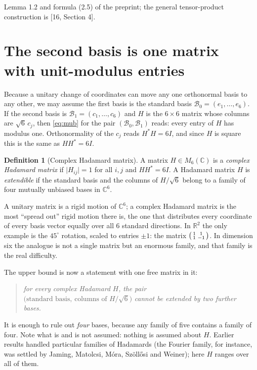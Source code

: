 \documentclass[11pt]{article}
\theoremstyle{definition}
\newtheorem{definition}{Definition}[section]
\theoremstyle{plain}
\theoremstyle{definition}
\newcommand{\C}{\mathbb{C}}
\newcommand{\R}{\mathbb{R}}
\newcommand{\abs}[1]{\lvert #1\rvert}
\newenvironment{claim}{\begin{quote}\itshape}{\end{quote}}
\begin{document}
\begin{paperbox}
Lemma 1.2 and formula (2.5) of the preprint; the general tensor-product construction is [16, Section 4].
\end{paperbox}

\section{The second basis is one matrix with unit-modulus entries}\label{sec:hadamard}

Because a unitary change of coordinates can move any one orthonormal basis to any other, we may
assume the first basis is the standard basis $\mathcal B_0=(e_1,\dots,e_6)$. If the second basis is
$\mathcal B_1=(c_1,\dots,c_6)$ and $H$ is the $6\times6$ matrix whose columns are $\sqrt6\,c_j$, then
\eqref{eq:mub} for the pair $(\mathcal B_0,\mathcal B_1)$ reads: every entry of $H$ has modulus one.
Orthonormality of the $c_j$ reads $H^*H=6I$, and since $H$ is square this is the same as $HH^*=6I$.

\begin{definition}[Complex Hadamard matrix]\label{def:had}
A matrix $H\in M_6(\C)$ is a \emph{complex Hadamard matrix} if
$\abs{H_{ij}}=1$ for all $i,j$ and $HH^*=6I$. A Hadamard matrix $H$ is \emph{extendible} if
the standard basis and the columns of $H/\sqrt6$ belong to a family of four mutually unbiased
bases in $\C^6$.
\end{definition}

\begin{ideabox}
A unitary matrix is a rigid motion of $\C^6$; a complex Hadamard matrix is the most ``spread out''
rigid motion there is, the one that distributes every coordinate of every basis vector equally
over all $6$ standard directions. In $\R^2$ the only example is the $45^\circ$ rotation, scaled to
entries $\pm1$: the matrix $\begin{psmallmatrix}1&1\\1&-1\end{psmallmatrix}$. In dimension six the
analogue is not a single matrix but an enormous family, and that family is the real difficulty.
\end{ideabox}

The upper bound is now a statement with one free matrix in it:
\begin{claim}
for every complex Hadamard $H$, the pair
$\bigl(\text{standard basis},\ \text{columns of }H/\sqrt6\bigr)$ cannot be extended by two further
bases.
\end{claim}
It is enough to rule out \emph{four} bases, because any family of five contains a family of four.
Note what is and is not assumed: nothing is assumed about $H$. Earlier results handled particular
families of Hadamards (the Fourier family, for instance, was settled by Jaming, Matolcsi, M\'ora,
Sz\"oll\H{o}si and Weiner); here $H$ ranges over all of them.
\end{document}
